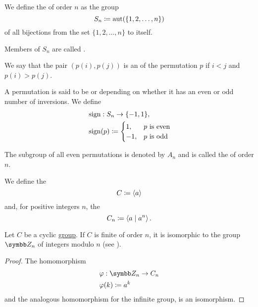 \begin{Definition}\label{def:symmetric_group}
  We define the  of order \( n \) as the group
  \begin{equation*}
    S_n \coloneqq \operatorname{aut}(\{ 1, 2, \ldots, n \})
  \end{equation*}
  of all bijections from the set \( \{ 1, 2, \ldots, n \} \) to itself.

  Members of \( S_n \) are called .

  We say that the pair \( (p(i), p(j)) \) is an  of the permutation \( p \) if \( i < j \) and \( p(i) > p(j) \).

  A permutation is said to be  or  depending on whether it has an even or odd number of inversions. We define
  \begin{align*}
    &\operatorname{sign}: S_n \to \{ -1, 1 \}, \\
    &\operatorname{sign}(p) \coloneqq \begin{cases}
      1, &p \text{ is even} \\
      -1, &p \text{ is odd}
    \end{cases}
  \end{align*}

  The subgroup of all even permutations is denoted by \( A_n \) and is called the  of order \( n \).
\end{Definition}

\begin{Definition}\label{def:cyclic_group}
  We define the 
  \begin{equation*}
    C \coloneqq \left\langle a \right\rangle
  \end{equation*}
  and, for positive integers \( n \), the 
  \begin{equation*}
    C_n \coloneqq \left\langle a \mid a^n \right\rangle.
  \end{equation*}
\end{Definition}

\begin{Proposition}\label{thm:cyclic_group_isomorphic_to_integers_modulo_n}
  Let \( C \) be a cyclic \hyperref[def:cyclic_group]{group}. If \( C \) is finite of order \( n \), it is isomorphic to the group \( \BZ_n \) of integers modulo \( n \) (see ).
\end{Proposition}
\begin{proof}
  The homomorphism
  \begin{align*}
    &\varphi: \BZ_n \to C_n \\
    &\varphi(k) \coloneqq a^k
  \end{align*}
  and the analogous homomorphism for the infinite group, is an isomorphism.
\end{proof}

